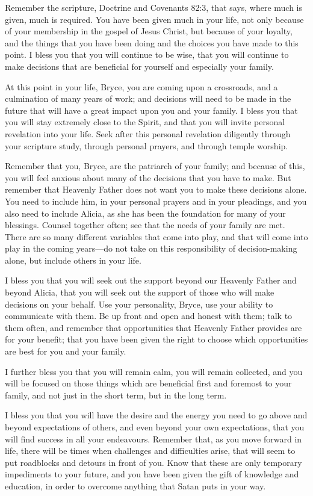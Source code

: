 			Remember the scripture, Doctrine and Covenants 82:3, that says, where much is given, much is required. You have been given much in your life, not only because of your membership in the gospel of Jesus Christ, but because of your loyalty, and the things that you have been doing and the choices you have made to this point. I bless you that you will continue to be wise, that you will continue to make decisions that are beneficial for yourself and especially your family.

			At this point in your life, Bryce, you are coming upon a crossroads, and a culmination of many years of work; and decisions will need to be made in the future that will have a great impact upon you and your family. I bless you that you will stay extremely close to the Spirit, and that you will invite personal revelation into your life. Seek after this personal revelation diligently through your scripture study, through personal prayers, and through temple worship. 

			Remember that you, Bryce, are the patriarch of your family; and because of this, you will feel anxious about many of the decisions that you have to make. But remember that Heavenly Father does not want you to make these decisions alone. You need to include him, in your personal prayers and in your pleadings, and you also need to include Alicia, as she has been the foundation for many of your blessings. Counsel together often; see that the needs of your family are met. There are so many different variables that come into play, and that will come into play in the coming years---do not take on this responsibility of decision-making alone, but include others in your life. 

			I bless you that you will seek out the support beyond our Heavenly Father and beyond Alicia, that you will seek out the support of those who will make decisions on your behalf. Use your personality, Bryce, use your ability to communicate with them. Be up front and open and honest with them; talk to them often, and remember that opportunities that Heavenly Father provides are for your benefit; that you have been given the right to choose which opportunities are best for you and your family. 

			I further bless you that you will remain calm, you will remain collected, and you will be focused on those things which are beneficial first and foremost to your family, and not just in the short term, but in the long term. 

			I bless you that you will have the desire and the energy you need to go above and beyond expectations of others, and even beyond your own expectations, that you will find success in all your endeavours. Remember that, as you move forward in life, there will be times when challenges and difficulties arise, that will seem to put roadblocks and detours in front of you. Know that these are only temporary impediments to your future, and you have been given the gift of knowledge and education, in order to overcome anything that Satan puts in your way. 

